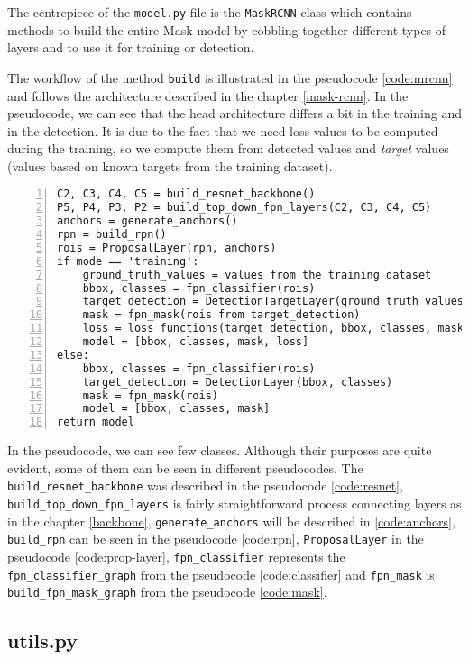 The centrepiece of the \verb|model.py| file is the \verb|MaskRCNN| class which contains methods to build the entire Mask  model by cobbling together different types of layers and to use it for training or detection.

The workflow of the method \verb|build| is illustrated in the pseudocode \ref{code:mrcnn} and follows the architecture described in the chapter \ref{mask-rcnn}. In the pseudocode, we can see that the head architecture differs a bit in the training and in the detection. It is due to the fact that we need loss values to be computed during the training, so we compute them from detected values and \textit{target} values (values based on known targets from the training dataset).

{\scriptsize
\begin{lstlisting}[style=python, caption={Mask R-CNN.build}, captionpos=b, label=code:mrcnn, deletekeywords={from},
backgroundcolor = \color{light-gray}, numbers=left, breaklines=true]
C2, C3, C4, C5 = build_resnet_backbone()
P5, P4, P3, P2 = build_top_down_fpn_layers(C2, C3, C4, C5)
anchors = generate_anchors()
rpn = build_rpn()
rois = ProposalLayer(rpn, anchors)
if mode == 'training':
    ground_truth_values = values from the training dataset
    bbox, classes = fpn_classifier(rois)
    target_detection = DetectionTargetLayer(ground_truth_values)
    mask = fpn_mask(rois from target_detection)
    loss = loss_functions(target_detection, bbox, classes, mask)
    model = [bbox, classes, mask, loss]
else:
    bbox, classes = fpn_classifier(rois)
    target_detection = DetectionLayer(bbox, classes)
    mask = fpn_mask(rois)
    model = [bbox, classes, mask]
return model
\end{lstlisting}}

In the pseudocode, we can see few classes. Although their purposes are quite evident, some of them can be seen in different pseudocodes. The \verb|build_resnet_backbone| was described in the pseudocode \ref{code:resnet}, \verb|build_top_down_fpn_layers| is fairly straightforward process connecting layers as in the chapter \ref{backbone}, \verb|generate_anchors| will be described in \ref{code:anchors}, \verb|build_rpn| can be seen in the pseudocode \ref{code:rpn}, \verb|ProposalLayer| in the pseudocode \ref{code:prop-layer}, \verb|fpn_classifier| represents the \verb|fpn_classifier_graph| from the pseudocode \ref{code:classifier} and \verb|fpn_mask| is \verb|build_fpn_mask_graph| from the pseudocode \ref{code:mask}.

\subsection{utils.py}
\label{utils}

